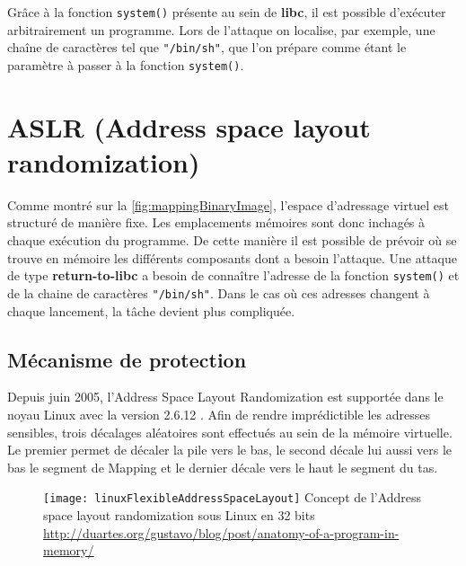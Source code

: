 Grâce à la fonction \texttt{system()} présente au sein de \textbf{libc}, il est possible d'exécuter arbitrairement un programme. Lors de l'attaque on localise, par exemple, une chaîne de caractères tel que \texttt{"/bin/sh"}, que l'on prépare comme étant le paramètre à passer à la fonction \texttt{system()}.

\section{ASLR (Address space layout randomization)}

Comme montré sur la \autoref{fig:mappingBinaryImage}, l'espace d'adressage virtuel est structuré de manière fixe. Les emplacements mémoires sont donc inchagés à chaque exécution du programme. De cette manière il est possible de prévoir où se trouve en mémoire les différents composants dont a besoin l'attaque. Une attaque de type \textbf{\og return-to-libc \fg} a besoin de connaître l'adresse de la fonction \texttt{system()} et de la chaine de caractères \texttt{"/bin/sh"}. Dans le cas où ces adresses changent à chaque lancement, la tâche devient plus compliquée.

\subsection{Mécanisme de protection}

Depuis juin 2005, l'Address Space Layout Randomization est supportée dans le noyau Linux avec la version 2.6.12 \cite{AddressSpaceLayoutRandomizationFR} \cite{AddressSpaceLayoutRandomizationEN}. Afin de rendre imprédictible les adresses sensibles, trois décalages aléatoires sont effectués au sein de la mémoire virtuelle. Le premier permet de décaler la pile vers le bas, le second décale lui aussi vers le bas le segment de Mapping et le dernier décale vers le haut le segment du tas.

\begin{figure}[H]
	\centering
	\texttt{[image: linuxFlexibleAddressSpaceLayout]}
	{Concept de l'Address space layout randomization sous Linux en 32 bits}
	{\url{http://duartes.org/gustavo/blog/post/anatomy-of-a-program-in-memory/}}
	\label{fig:linuxFlexibleAddressSpaceLayout}
\end{figure}

